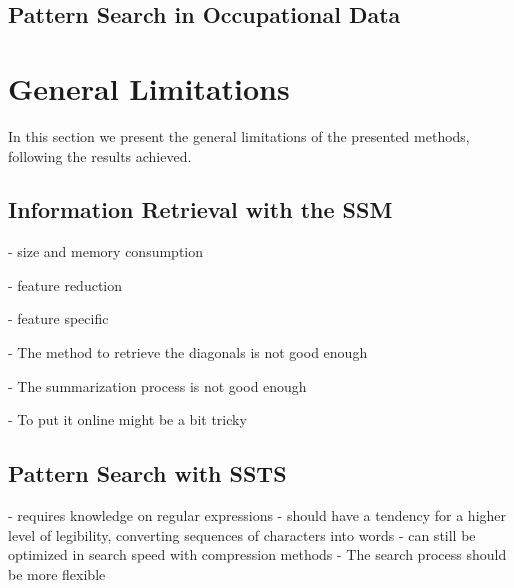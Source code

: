 %

\subsection{Pattern Search in Occupational Data}
\label{subsec:search}

\section{General Limitations}

In this section we present the general limitations of the presented methods, following the results achieved.

\subsection{Information Retrieval with the SSM}

- size and memory consumption

- feature reduction

- feature specific

- The method to retrieve the diagonals is not good enough

- The summarization process is not good enough

- To put it online might be a bit tricky

\subsection{Pattern Search with SSTS}

- requires knowledge on regular expressions
- should have a tendency for a higher level of legibility, converting sequences of characters into words
- can still be optimized in search speed with compression methods
- The search process should be more flexible 

